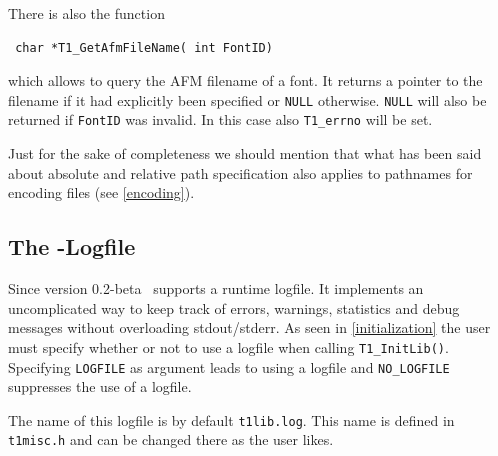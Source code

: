 There is also the function 
\precorr
\begin{verbatim}
 char *T1_GetAfmFileName( int FontID)
\end{verbatim}\postcorr
which allows to query the AFM filename of a font. It returns a pointer to the
filename if it had explicitly been specified or \verb+NULL+
otherwise. \verb+NULL+ will also be returned if \verb+FontID+ was invalid. In
this case also \verb+T1_errno+ will be set.  

Just for the sake of completeness we should mention that what has been said 
about absolute and relative path specification
also applies to pathnames for encoding files (see \ref{encoding}).




\subsection{The \tonelib-Logfile}
\label{logfile}%
Since version 0.2-beta \tonelib\ supports a runtime logfile.
It implements an uncomplicated way to keep track of errors,
warnings, statistics and debug messages without overloading stdout/stderr. As
seen in \ref{initialization} the user must specify whether or not to use a
logfile when calling \verb+T1_InitLib()+. Specifying \verb+LOGFILE+ as
argument leads to using a logfile and \verb+NO_LOGFILE+ suppresses the use of a
logfile.

The name of this logfile is by default \verb+t1lib.log+. This name is defined
in \verb+t1misc.h+ and can be changed there as the user likes.

